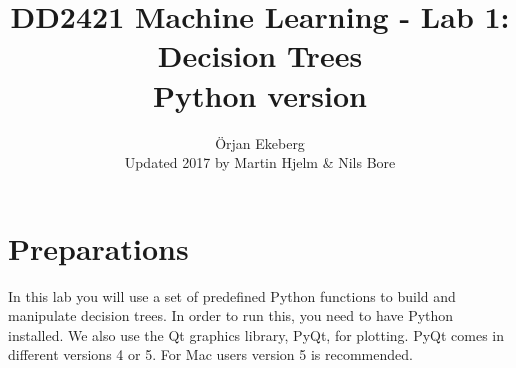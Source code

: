 \documentclass[11pt]{article}
\title{\vspace{-5.0cm}DD2421 Machine Learning - Lab 1: Decision Trees \\ Python version}
\author{\"Orjan Ekeberg\\ Updated 2017 by Martin Hjelm \& Nils Bore }
\begin{document}
\maketitle

\section{Preparations}

In this lab you will use a set of predefined Python functions to
build and manipulate decision trees.  In order to run this, you
need to have Python installed.  We also use the Qt graphics library,
PyQt, for plotting. PyQt comes in different versions 4 or 5. For
Mac users version 5 is recommended. 
\end{document}
